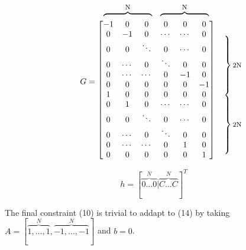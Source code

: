 \documentclass[12pt,twoside,notitlepage]{report}
\begin{document}
\[G =
\begin{matrix} %
    \begin{matrix}   %
      \overbrace{\hphantom{\begin{matrix}-1 & \cdots & -1\end{matrix}}}^{\text{\footnotesize N}}
                                  &
      \overbrace{
        \hphantom{\begin{matrix}-1 & \cdots & -1\end{matrix}}
      }^{\text{\footnotesize N}}
    \end{matrix}
    &
  \\
\begin{bmatrix}
 -1 & 0 & 0 & 0 & 0 & 0\\
  0 & -1 & 0 & \cdots & \cdots & 0\\
  0 & 0 & \ddots  & 0 & \cdots & 0\\
  0 & \cdots & 0 & \ddots & 0 & 0\\
  0 & \cdots & \cdots & 0 & -1 & 0\\
  0 & 0 & 0 & 0 & 0 & -1 \\
  1 & 0 & 0 & 0 & 0 & 0\\
  0 & 1 & 0 & \cdots & \cdots & 0\\
  0 & 0 & \ddots  & 0 & \cdots & 0\\
  0 & \cdots & 0 & \ddots & 0 & 0\\
  0 & \cdots & \cdots & 0 & 1 & 0\\
  0 & 0 & 0 & 0 & 0 & 1 \\
\end{bmatrix}
  &
    \begin{matrix}    %
      \vphantom{0} \\ %
        \left.\vphantom{\begin{matrix} 0 \\ 0 \\ 0 \\ 0 \\ 0 \\ 0 \\\end{matrix}}\right\}
      \text{\footnotesize 2N} \\
        \left.\vphantom{\begin{matrix} 0 \\ 0 \\ 0 \\ 0 \\ 0 \\ 0 \end{matrix}}\right\}
      \text{\footnotesize 2N} 
    \end{matrix}
    \mspace{-33mu}
\end{matrix}
\]


\[h = [\overbrace{0 \dots 0}^N|\overbrace{C \dots C}^N]^T\]

The final constraint (10) is trivial to addapt to (14) by taking 
\( A=[\overbrace{1,\dots,1}^N,\overbrace{-1,\dots,-1}^N]\) and \(b=0\).
\end{document}
